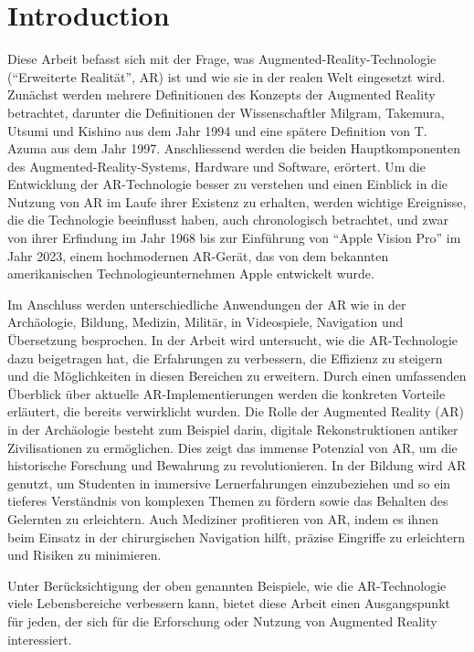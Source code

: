 \section{Introduction}

Diese Arbeit befasst sich mit der Frage, was Augmented-Reality-Technologie (“Erweiterte Realität”, AR) ist und wie sie in der realen Welt eingesetzt wird. Zunächst werden mehrere Definitionen des Konzepts der Augmented Reality betrachtet, darunter die Definitionen der Wissenschaftler Milgram, Takemura, Utsumi und Kishino aus dem Jahr 1994 und eine spätere Definition von T. Azuma aus dem Jahr 1997. Anschliessend werden die beiden Hauptkomponenten des Augmented-Reality-Systems, Hardware und Software, erörtert. Um die Entwicklung der AR-Technologie besser zu verstehen und einen Einblick in die Nutzung von AR im Laufe ihrer Existenz zu erhalten, werden wichtige Ereignisse, die die Technologie beeinflusst haben, auch chronologisch betrachtet, und zwar von ihrer Erfindung im Jahr 1968 bis zur Einführung von “Apple Vision Pro” im Jahr 2023, einem hochmodernen AR-Gerät, das von dem bekannten amerikanischen Technologieunternehmen Apple entwickelt wurde. \cite{Apple}   

Im Anschluss werden unterschiedliche Anwendungen der AR wie in der Archäologie, Bildung, Medizin, Militär, in Videospiele, Navigation und Übersetzung besprochen. In der Arbeit wird untersucht, wie die AR-Technologie dazu beigetragen hat, die Erfahrungen zu verbessern, die Effizienz zu steigern und die Möglichkeiten in diesen Bereichen zu erweitern. Durch einen umfassenden Überblick über aktuelle AR-Implementierungen werden die konkreten Vorteile erläutert, die bereits verwirklicht wurden. Die Rolle der Augmented Reality (AR) in der Archäologie besteht zum Beispiel darin, digitale Rekonstruktionen antiker Zivilisationen zu ermöglichen. Dies zeigt das immense Potenzial von AR, um die historische Forschung und Bewahrung zu revolutionieren. In der Bildung wird AR genutzt, um Studenten in immersive Lernerfahrungen einzubeziehen und so ein tieferes Verständnis von komplexen Themen zu fördern sowie das Behalten des Gelernten zu erleichtern. Auch Mediziner profitieren von AR, indem es ihnen beim Einsatz in der chirurgischen Navigation hilft, präzise Eingriffe zu erleichtern und Risiken zu minimieren.

Unter Berücksichtigung der oben genannten Beispiele, wie die AR-Technologie viele Lebensbereiche verbessern kann, bietet diese Arbeit einen Ausgangspunkt für jeden, der sich für die Erforschung oder Nutzung von Augmented Reality interessiert.

